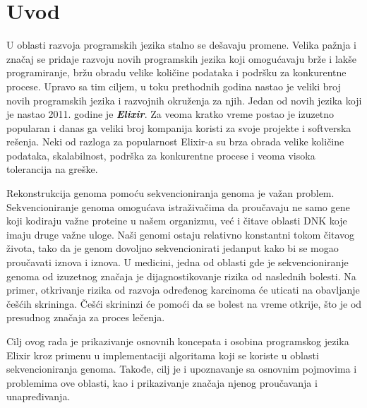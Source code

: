 \documentclass[12pt,oneside]{memoir}
\begin{document}
\frontmatter
\naslovna
\komisija
\apstrakt
\tableofcontents*

\mainmatter
\chapter{Uvod}

U oblasti razvoja programskih jezika stalno se dešavaju promene. Velika pažnja i značaj se pridaje razvoju novih programskih jezika koji omogućavaju brže i lakše programiranje, bržu obradu velike količine podataka i podršku za konkurentne procese. Upravo sa tim ciljem, u toku prethodnih godina nastao je veliki broj novih programskih jezika i razvojnih okruženja za njih. Jedan od novih jezika koji je nastao 2011. godine je \textit{\textbf{Elixir}}. Za veoma kratko vreme postao je izuzetno popularan i danas ga veliki broj kompanija koristi za svoje projekte i softverska rešenja. Neki od razloga za popularnost Elixir-a su brza obrada velike količine podataka, skalabilnost, podrška za konkurentne procese i veoma visoka tolerancija na greške.

Rekonstrukcija genoma pomoću sekvencioniranja genoma je važan problem. Sekvencioniranje genoma omogućava istraživačima da proučavaju ne samo gene koji kodiraju važne proteine u našem organizmu, već i čitave oblasti DNK koje imaju druge važne uloge. Naši genomi ostaju relativno konstantni tokom čitavog života, tako da je genom dovoljno sekvencionirati jedanput kako bi se mogao proučavati iznova i iznova. U medicini, jedna od oblasti gde je sekvencioniranje genoma od izuzetnog značaja je dijagnostikovanje rizika od naslednih bolesti. Na primer, otkrivanje rizika od razvoja određenog karcinoma će uticati na obavljanje češćih skrininga. Češći skrininzi će pomoći da se bolest na vreme otkrije, što je od presudnog značaja za proces lečenja.

Cilj ovog rada je prikazivanje osnovnih koncepata i osobina programskog jezika Elixir kroz primenu u implementaciji algoritama koji se koriste u oblasti sekvencioniranja genoma. Takođe, cilj je i upoznavanje sa osnovnim pojmovima i problemima ove oblasti, kao i prikazivanje značaja njenog proučavanja i unapređivanja. 
\end{document}
